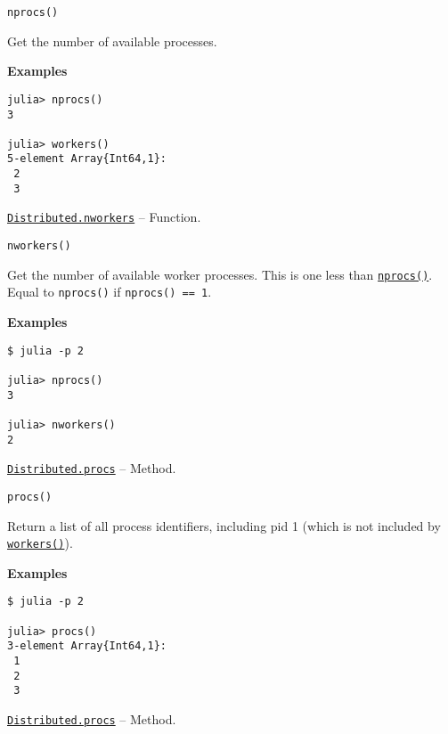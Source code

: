 \begin{adjustwidth}{2em}{0pt}


\begin{verbatim}
nprocs()
\end{verbatim}

Get the number of available processes.

\textbf{Examples}


\begin{verbatim}
julia> nprocs()
3

julia> workers()
5-element Array{Int64,1}:
 2
 3
\end{verbatim}



\end{adjustwidth}
\hypertarget{7237632848154090273}{}
\hyperlink{7237632848154090273}{\texttt{Distributed.nworkers}}  -- {Function.}

\begin{adjustwidth}{2em}{0pt}


\begin{verbatim}
nworkers()
\end{verbatim}

Get the number of available worker processes. This is one less than \hyperlink{12624410612036310990}{\texttt{nprocs()}}. Equal to \texttt{nprocs()} if \texttt{nprocs() == 1}.

\textbf{Examples}


\begin{verbatim}
$ julia -p 2

julia> nprocs()
3

julia> nworkers()
2
\end{verbatim}



\end{adjustwidth}
\hypertarget{10683956780105113822}{}
\hyperlink{10683956780105113822}{\texttt{Distributed.procs}}  -- {Method.}

\begin{adjustwidth}{2em}{0pt}


\begin{verbatim}
procs()
\end{verbatim}

Return a list of all process identifiers, including pid 1 (which is not included by \hyperlink{7474509137601932173}{\texttt{workers()}}).

\textbf{Examples}


\begin{verbatim}
$ julia -p 2

julia> procs()
3-element Array{Int64,1}:
 1
 2
 3
\end{verbatim}



\end{adjustwidth}
\hypertarget{12431527815799129129}{}
\hyperlink{12431527815799129129}{\texttt{Distributed.procs}}  -- {Method.}

